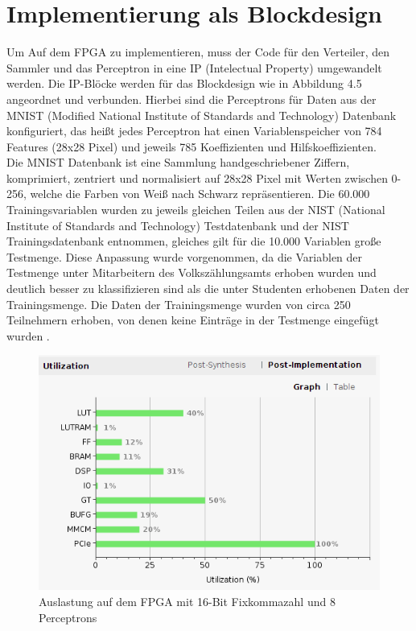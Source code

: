 \section{Implementierung als Blockdesign}
Um Auf dem FPGA zu implementieren, muss der Code für den Verteiler, den Sammler und das Perceptron in eine IP (Intelectual Property) umgewandelt werden. Die IP-Blöcke werden für das Blockdesign wie in Abbildung 4.5 angeordnet und verbunden. Hierbei sind die Perceptrons für Daten aus der MNIST (Modified National Institute of Standards and Technology) Datenbank konfiguriert, das heißt jedes Perceptron hat einen Variablenspeicher von 784 Features (28x28 Pixel) und jeweils 785 Koeffizienten und Hilfskoeffizienten.\\
Die MNIST Datenbank ist eine Sammlung handgeschriebener Ziffern, komprimiert, zentriert und normalisiert auf 28x28 Pixel mit Werten zwischen 0-256, welche die Farben von Weiß nach Schwarz repräsentieren. Die 60.000 Trainingsvariablen wurden zu jeweils gleichen Teilen aus der NIST (National Institute of Standards and Technology) Testdatenbank und der NIST Trainingsdatenbank entnommen, gleiches gilt für die 10.000 Variablen große Testmenge. Diese Anpassung wurde vorgenommen, da die Variablen der Testmenge unter Mitarbeitern des Volkszählungsamts erhoben wurden und deutlich besser zu klassifizieren sind als die unter Studenten erhobenen Daten der Trainingsmenge. Die Daten der Trainingsmenge wurden von circa 250 Teilnehmern erhoben, von denen keine Einträge in der Testmenge eingefügt wurden \cite{MNIST}.\\
\begin{figure}[ht]
\centering
\includegraphics[scale=0.9]{bilder/auslastung1}
\caption{Auslastung auf dem FPGA mit 16-Bit Fixkommazahl und 8 Perceptrons}
\end{figure}\\
